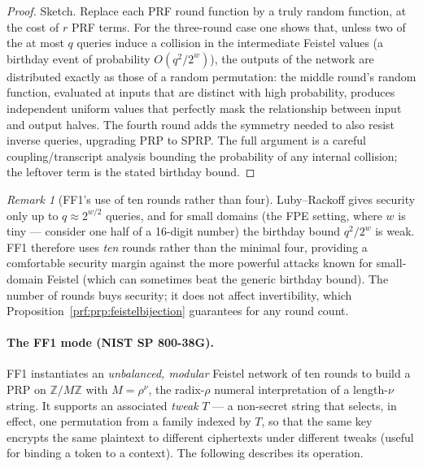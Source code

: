 \documentclass[11pt,a4paper]{article}
\theoremstyle{definition}
\theoremstyle{remark}
\newtheorem{remark}[theorem]{Remark}
\newcommand{\Z}{\ensuremath{\mathbb{Z}}}
\begin{document}
\begin{proof}
Sketch. Replace each PRF round function by a truly random function, at the cost of \(r\) PRF terms. For the three-round case one shows that, unless two of the at most \(q\) queries induce a collision in the intermediate Feistel values (a birthday event of probability \(O(q^{2}/2^{w})\)), the outputs of the network are distributed exactly as those of a random permutation: the middle round's random function, evaluated at inputs that are distinct with high probability, produces independent uniform values that perfectly mask the relationship between input and output halves. The fourth round adds the symmetry needed to also resist inverse queries, upgrading PRP to SPRP. The full argument is a careful coupling/transcript analysis bounding the probability of any internal collision; the leftover term is the stated birthday bound.
\end{proof}

\begin{remark}[FF1's use of ten rounds rather than four]\label{prf:rem:rounds}
Luby--Rackoff gives security only up to \(q \approx 2^{w/2}\) queries, and for small domains (the FPE setting, where \(w\) is tiny --- consider one half of a 16-digit number) the birthday bound \(q^2/2^w\) is weak. FF1 therefore uses \emph{ten} rounds rather than the minimal four, providing a comfortable security margin against the more powerful attacks known for small-domain Feistel (which can sometimes beat the generic birthday bound). The number of rounds buys security; it does not affect invertibility, which Proposition~\ref{prf:prp:feistelbijection} guarantees for any round count.
\end{remark}

\paragraph{The FF1 mode (NIST SP 800-38G).} FF1 instantiates an \emph{unbalanced, modular} Feistel network of ten rounds to build a PRP on \(\Z/M\Z\) with \(M = \rho^{\nu}\), the radix-\(\rho\) numeral interpretation of a length-\(\nu\) string. It supports an associated \emph{tweak} \(T\) --- a non-secret string that selects, in effect, one permutation from a family indexed by \(T\), so that the same key encrypts the same plaintext to different ciphertexts under different tweaks (useful for binding a token to a context). The following describes its operation.
\end{document}
